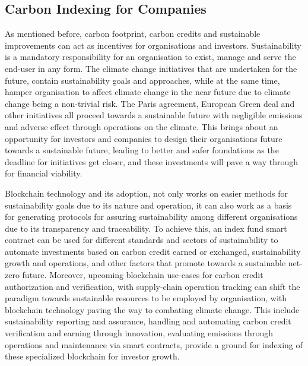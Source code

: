 \documentclass[11pt, a4paper]{article}
\begin{document}
\subsection*{Carbon Indexing for Companies}

As mentioned before, carbon footprint, carbon credits and sustainable improvements can act as incentives for organisations and investors. Sustainability is a mandatory responsibility for an organisation to exist, manage and serve the end-user in any form. The climate change initiatives that are undertaken for the future, contain sustainability goals and approaches, while at the same time, hamper organisation to affect climate change in the near future due to climate change being a non-trivial risk. \cite{fernandez-vazquez_blockchain_2019} The Paris agreement, European Green deal and other initiatives all proceed towards a sustainable future with negligible emissions and adverse effect through operations on the climate. This brings about an opportunity for investors and companies to design their organisations future towards a sustainable future, leading to better and safer foundations as the deadline for initiatives get closer, and these investments will pave a way through for financial viability. \cite{de_franco_carbon_2018}

Blockchain technology and its adoption, not only works on easier methods for sustainability goals due to its nature and operation, it can also work as a basis for generating protocols for assuring sustainability among different organisations due to its transparency and traceability. \cite{bakarich_use_2020} To achieve this, an index fund smart contract can be used for different standards and sectors of sustainability to automate investments based on carbon credit earned or exchanged, sustainability growth and operations, and other factors that promote towards a sustainable net-zero future. Moreover, upcoming blockchain use-cases for carbon credit authorization and verification, with supply-chain operation tracking can shift the paradigm towards sustainable resources to be employed by organisation, with blockchain technology paving the way to combating climate change. \cite{strack_blockchain_2022} This include sustainability reporting and assurance, handling and automating carbon credit verification and earning through innovation, evaluating emissions through operations and maintenance via smart contracts, provide a ground for indexing of these specialized blockchain for investor growth. \cite{albano_energy_2019}
\end{document}
